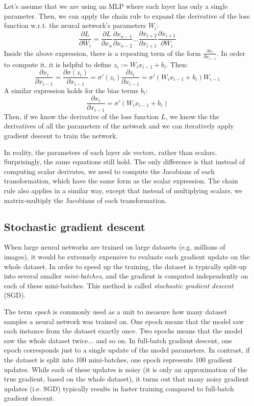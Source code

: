 \documentclass[12pt]{article}
\begin{document}
Let's assume that we are using an MLP where each layer has only a single parameter. Then, we can apply the chain rule to expand the derivative of the loss function w.r.t. the neural network's parameters $W_i$:
$$
\frac{\partial L}{\partial W_i} = \frac{\partial L}{\partial x_n} \frac{\partial x_{n-1}}{\partial x_{n-2}} \ldots \frac{\partial x_{i+2}}{\partial x_{i+1}} \frac{\partial x_{i+1}}{\partial W_i}
$$
Inside the above expression, there is a repeating term of the form $\frac{\partial x_{i}}{\partial x_{i-1}}$. In order to compute it, it is helpful to define $z_i := W_i x_{i-1} + b_i$. Then:
$$
\frac{\partial x_{i}}{\partial x_{i-1}} = \frac{\partial \sigma(z_{i})}{\partial x_{i-1}} = \sigma'(z_i) \frac{\partial z_{i}}{\partial x_{i-1}} = \sigma'(W_i x_{i-1} + b_i) W_{i-1}
$$
A similar expression holds for the bias terms $b_i$:
$$
\frac{\partial x_{i}}{\partial x_{i-1}} = \sigma'(W_i x_{i-1} + b_i)
$$
Then, if we know the derivative of the loss function $L$, we know the the derivatives of all the parameters of the network and we can iteratively apply gradient descent to train the network.

In reality, the parameters of each layer ale vectors, rather than scalars. Surprisingly, the same equations still hold. The only difference is that instead of computing scalar derivates, we need to compute the Jacobians of each transformation, which have the same form as the scalar expression. The chain rule also applies in a similar way, except that instead of multiplying scalars, we matrix-multiply the Jacobians of each transformation.

\subsection{Stochastic gradient descent}

When large neural networks are trained on large datasets (e.g. millions of images), it would be extremely expensive to evaluate each gradient update on the whole dataset. In order to speed up the training, the dataset is typically split-up into several smaller \textit{mini-batches}, and the gradient is computed independently on each of these mini-batches. This method is called \textit{stochastic gradient descent} (SGD).

The term \textit{epoch} is commonly used as a unit to measure how many dataset samples a neural network was trained on. One epoch means that the model saw each instance from the dataset exactly once. Two epochs means that the model saw the whole dataset twice... and so on. In full-batch gradient descent, one epoch corresponds just to a single update of the model parameters. In contrast, if the dataset is split into 100 mini-batches, one epoch represents 100 gradient updates. While each of these updates is noisy (it is only an approximation of the true gradient, based on the whole dataset), it turns out that many noisy gradient updates (i.e. SGD) typically results in faster training compared to full-batch gradient descent.
\end{document}
